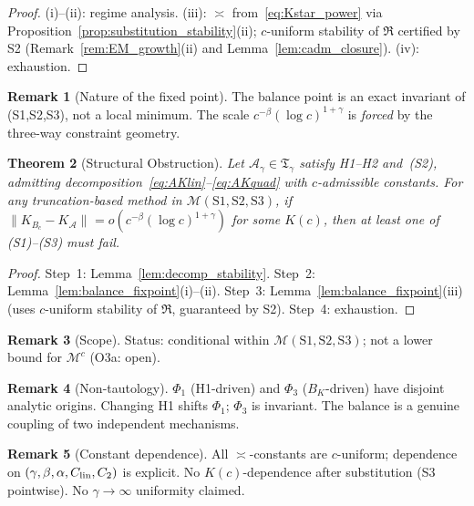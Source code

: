 \documentclass[12pt,a4paper]{amsart}
\newtheorem{theorem}{Theorem}[section]
\theoremstyle{definition}
\newtheorem{remark}[theorem]{Remark}
\newcommand{\cA}{\mathcal{A}}
\newcommand{\cAg}{\mathcal{A}_\gamma}
\newcommand{\cK}{K_{B_c}}
\newcommand{\cKA}{K_{\cA}}
\newcommand{\normh}[2]{\|#1\|_{#2}}
\newcommand{\BK}{B_K}
\begin{document}
\begin{proof}
(i)--(ii): regime analysis.
(iii): $\asymp$ from~\eqref{eq:Kstar_power} via
Proposition~\ref{prop:substitution_stability}(ii);
$c$-uniform stability of $\mathfrak{R}$ certified by S2
(Remark~\ref{rem:EM_growth}(ii) and Lemma~\ref{lem:cadm_closure}).
(iv): exhaustion.
\end{proof}

\begin{remark}[Nature of the fixed point]
\label{rem:fixpoint_nature}
The balance point is an exact invariant of (S1,S2,S3), not a local minimum.
The scale $c^{-\beta}(\log c)^{1+\gamma}$ is \emph{forced}
by the three-way constraint geometry.
\end{remark}

\begin{theorem}[Structural Obstruction]
\label{thm:rate_obstruction}
Let $\cAg\in\mathfrak{T}_\gamma$ satisfy H1--H2 and~(S2),
admitting decomposition~\eqref{eq:AKlin}--\eqref{eq:AKquad}
with $c$-admissible constants.
For any truncation-based method in $\mathcal{M}(\mathrm{S1,S2,S3})$,
if $\normh{\cK-\cKA}{} = o(c^{-\beta}(\log c)^{1+\gamma})$
for some $K(c)$, then at least one of \textnormal{(S1)--(S3)} must fail.
\end{theorem}

\begin{proof}
Step~1: Lemma~\ref{lem:decomp_stability}.
Step~2: Lemma~\ref{lem:balance_fixpoint}(i)--(ii).
Step~3: Lemma~\ref{lem:balance_fixpoint}(iii)
  (uses $c$-uniform stability of $\mathfrak{R}$, guaranteed by S2).
Step~4: exhaustion.
\end{proof}

\begin{remark}[Scope]
\label{rem:obstruction_scope}
Status: conditional within $\mathcal{M}(\mathrm{S1,S2,S3})$;
not a lower bound for $\mathcal{M}^c$ (O3a: open).
\end{remark}

\begin{remark}[Non-tautology]
\label{rem:non_tautology}
$\Phi_1$ (H1-driven) and $\Phi_3$ ($\BK$-driven)
have disjoint analytic origins.
Changing H1 shifts $\Phi_1$; $\Phi_3$ is invariant.
The balance is a genuine coupling of two independent mechanisms.
\end{remark}

\begin{remark}[Constant dependence]
\label{rem:constant_dependence}
All $\asymp$-constants are $c$-uniform;
dependence on $(\gamma,\beta,\alpha,C_{\rm lin},C_2)$ is explicit.
No $K(c)$-dependence after substitution (S3 pointwise).
No $\gamma\to\infty$ uniformity claimed.
\end{remark}
\end{document}

